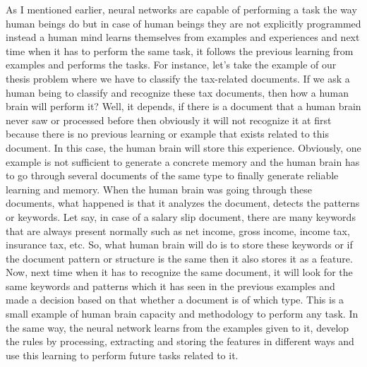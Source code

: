 As I mentioned earlier, neural networks are capable of performing a task the way human beings do but in case of human beings they are not explicitly programmed instead a human mind learns themselves from examples and experiences and next time when it has to perform the same task, it follows the previous learning from examples and performs the tasks. For instance, let's take the example of our thesis problem where we have to classify the tax-related documents. If we ask a human being to classify and recognize these tax documents, then how a human brain will perform it? Well, it depends, if there is a document that a human brain never saw or processed before then obviously it will not recognize it at first because there is no previous learning or example that exists related to this document. In this case, the human brain will store this experience. Obviously, one example is not sufficient to generate a concrete memory and the human brain has to go through several documents of the same type to finally generate reliable learning and memory. When the human brain was going through these documents, what happened is that it analyzes the document, detects the patterns or keywords. Let say, in case of a salary slip document, there are many keywords that are always present normally such as net income, gross income, income tax, insurance tax, etc. So, what human brain will do is to store these keywords or if the document pattern or structure is the same then it also stores it as a feature. Now, next time when it has to recognize the same document, it will look for the same keywords and patterns which it has seen in the previous examples and made a decision based on that whether a document is of which type. This is a small example of human brain capacity and methodology to perform any task.  In the same way, the neural network learns from the examples given to it, develop the rules by processing, extracting and storing the features in different ways and use this learning to perform future tasks related to it.

